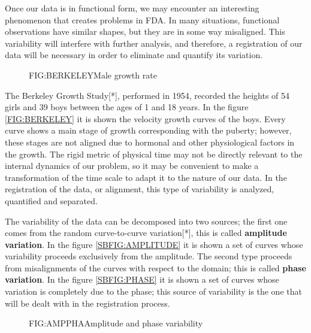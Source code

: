 Once our data is in functional form, we may encounter an interesting phenomenon
that creates problems in FDA. In many situations, functional observations have
similar shapes, but they are in some way misaligned. This variability will
interfere with further analysis, and therefore, a registration of our data will
be necessary in order to eliminate and quantify its variation.

\begin{figure}[Male growth rate]{FIG:BERKELEY}{Male growth rate}
\end{figure}

The Berkeley Growth Study[*], performed in 1954, recorded the heights of 54
girls and 39 boys between the ages of 1 and 18 years. In the figure
\ref{FIG:BERKELEY} it is shown the velocity growth curves of the boys. Every curve shows a main stage of growth corresponding with the puberty;
however, these stages are not aligned due to hormonal and other
physiological factors in the growth. The rigid metric of physical time may not
be directly relevant to the internal dynamics of our problem, so it may be
convenient to make a transformation of the time scale to adapt it to the nature
of our data. In the registration of the data, or alignment, this type of
variability is analyzed, quantified and separated.



The variability of the data can be decomposed into two sources; the first one
comes from the random curve-to-curve variation[*], this is called
\textbf{amplitude variation}. In the figure \ref{SBFIG:AMPLITUDE} it is shown a
set of curves whose variability proceeds exclusively from the amplitude. The
second type proceeds from misalignments of the curves with respect to the
domain; this is called \textbf{phase variation}. In the figure
\ref{SBFIG:PHASE} it is shown a set of curves whose variation is completely due
to the phase; this source of variability is the one that will be dealt with in
the registration process.

\begin{figure}[Amplitude and phase variability]{FIG:AMPPHA}{Amplitude and phase variability}
   \quad
\end{figure}
